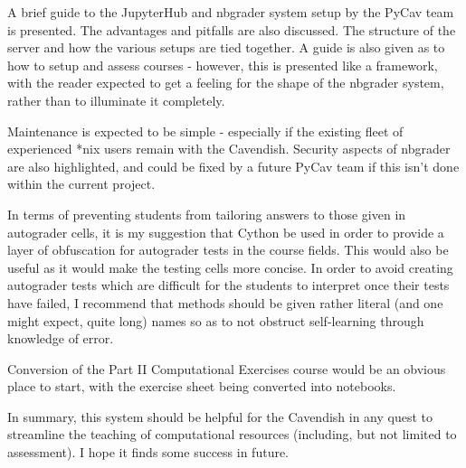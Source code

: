 A brief guide to the JupyterHub and nbgrader system setup by the PyCav team is presented. The advantages and pitfalls are also discussed. The structure of the server and how the various setups are tied together. A guide is also given as to how to setup and assess courses - however, this is presented like a framework, with the reader expected to get a feeling for the shape of the nbgrader system, rather than to illuminate it completely.

Maintenance is expected to be simple - especially if the existing fleet of experienced *nix users remain with the Cavendish. Security aspects of nbgrader are also highlighted, and could be fixed by a future PyCav team if this isn't done within the current project.

In terms of preventing students from tailoring answers to those given in autograder cells, it is my suggestion that Cython be used in order to provide a layer of obfuscation for autograder tests in the course fields. This would also be useful as it would make the testing cells more concise. In order to avoid creating autograder tests which are difficult for the students to interpret once their tests have failed, I recommend that methods should be given rather literal (and one might expect, quite long) names so as to not obstruct self-learning through knowledge of error.

Conversion of the Part II Computational Exercises course would be an obvious place to start, with the exercise sheet being converted into notebooks.

In summary, this system should be helpful for the Cavendish in any quest to streamline the teaching of computational resources (including, but not limited to assessment). I hope it finds some success in future.